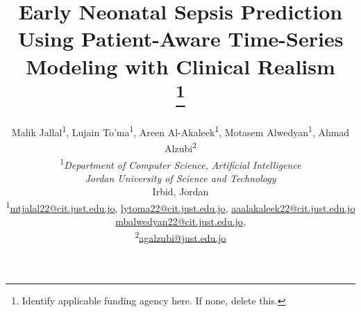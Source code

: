 \documentclass[conference]{IEEEtran}
\begin{document}


\title{Early Neonatal Sepsis Prediction Using Patient-Aware Time-Series Modeling with Clinical Realism  \\
\thanks{Identify applicable funding agency here. If none, delete this.}
}
\usepackage{hyperref} %

\author{
Malik Jallal\textsuperscript{1},
Lujain To’ma\textsuperscript{1},
Areen Al-Akaleek\textsuperscript{1},
Motasem Alwedyan\textsuperscript{1},
Ahmad Alzubi\textsuperscript{2}\\[0.3em]

\textsuperscript{1}\textit{Department of Computer Science, Artificial Intelligence}\\
\textit{Jordan University of Science and Technology}\\
Irbid, Jordan\\
\textsuperscript{1}\href{mailto:mtjalal22@cit.just.edu.jo}{mtjalal22@cit.just.edu.jo},
\href{mailto:lytoma22@cit.just.edu.jo}{lytoma22@cit.just.edu.jo},
\href{mailto:aaalakaleek22@cit.just.edu.jo}{aaalakaleek22@cit.just.edu.jo}
\href{mailto:mbalwedyan22@cit.just.edu.jo}{mbalwedyan22@cit.just.edu.jo},
\\[0.3em]


\textsuperscript{2}\href{mailto:agalzubi@just.edu.jo}{agalzubi@just.edu.jo}
}



\maketitle
\end{document}

